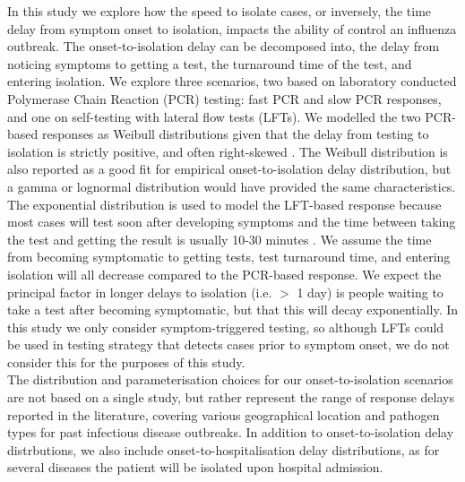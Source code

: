 \documentclass{article}
\begin{document}
In this study we explore how the speed to isolate cases, or inversely, the time delay from symptom onset to isolation, impacts the ability of control an influenza outbreak. The onset-to-isolation delay can be decomposed into, the delay from noticing symptoms to getting a test, the turnaround time of the test, and entering isolation. We explore three scenarios, two based on laboratory conducted Polymerase Chain Reaction (PCR) testing: fast PCR and slow PCR responses, and one on self-testing with lateral flow tests (LFTs). We modelled the two PCR-based responses as Weibull distributions given that the delay from testing to isolation is strictly positive, and often right-skewed \citep{zhangEvolvingEpidemiologyTransmission2020}. The Weibull distribution is also reported as a good fit for empirical onset-to-isolation delay distribution, but a gamma or lognormal distribution would have provided the same characteristics. The exponential distribution is used to model the LFT-based response because most cases will test soon after developing symptoms and the time between taking the test and getting the result is usually 10-30 minutes \citep{petoCOVID19RapidAntigen2021}. We assume the time from becoming symptomatic to getting tests, test turnaround time, and entering isolation will all decrease compared to the PCR-based response. We expect the principal factor in longer delays to isolation (i.e. $>$ 1 day) is people waiting to take a test after becoming symptomatic, but that this will decay exponentially. In this study we only consider symptom-triggered testing, so although LFTs could be used in testing strategy that detects cases prior to symptom onset, we do not consider this for the purposes of this study. \\

The distribution and parameterisation choices for our onset-to-isolation scenarios are not based on a single study, but rather represent the range of response delays reported in the literature, covering various geographical location and pathogen types for past infectious disease outbreaks. In addition to onset-to-isolation delay distrbutions, we also include onset-to-hospitalisation delay distributions, as for several diseases the patient will be isolated upon hospital admission. \\
\end{document}
